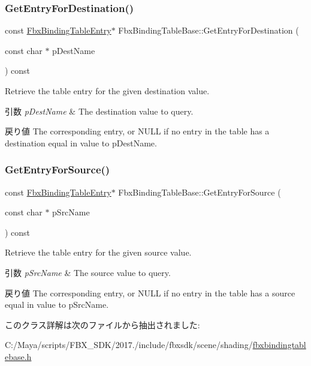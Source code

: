 \subsubsection{\texorpdfstring{Get\+Entry\+For\+Destination()}{GetEntryForDestination()}}
{\footnotesize\ttfamily const \hyperlink{class_fbx_binding_table_entry}{Fbx\+Binding\+Table\+Entry}$\ast$ Fbx\+Binding\+Table\+Base\+::\+Get\+Entry\+For\+Destination (\begin{DoxyParamCaption}\item[{const char $\ast$}]{p\+Dest\+Name }\end{DoxyParamCaption}) const}

Retrieve the table entry for the given destination value. 
\begin{DoxyParams}{引数}
{\em p\+Dest\+Name} & The destination value to query. \\
\hline
\end{DoxyParams}
\begin{DoxyReturn}{戻り値}
The corresponding entry, or N\+U\+LL if no entry in the table has a destination equal in value to p\+Dest\+Name. 
\end{DoxyReturn}
\mbox{\label{class_fbx_binding_table_base_aa954d91bd7cf21ab56714414ca1e29f8}} 
\subsubsection{\texorpdfstring{Get\+Entry\+For\+Source()}{GetEntryForSource()}}
{\footnotesize\ttfamily const \hyperlink{class_fbx_binding_table_entry}{Fbx\+Binding\+Table\+Entry}$\ast$ Fbx\+Binding\+Table\+Base\+::\+Get\+Entry\+For\+Source (\begin{DoxyParamCaption}\item[{const char $\ast$}]{p\+Src\+Name }\end{DoxyParamCaption}) const}

Retrieve the table entry for the given source value. 
\begin{DoxyParams}{引数}
{\em p\+Src\+Name} & The source value to query. \\
\hline
\end{DoxyParams}
\begin{DoxyReturn}{戻り値}
The corresponding entry, or N\+U\+LL if no entry in the table has a source equal in value to p\+Src\+Name. 
\end{DoxyReturn}


このクラス詳解は次のファイルから抽出されました\+:\begin{DoxyCompactItemize}
\item 
C\+:/\+Maya/scripts/\+F\+B\+X\+\_\+\+S\+D\+K/2017./include/fbxsdk/scene/shading/\hyperlink{fbxbindingtablebase_8h}{fbxbindingtablebase.\+h}\end{DoxyCompactItemize}
